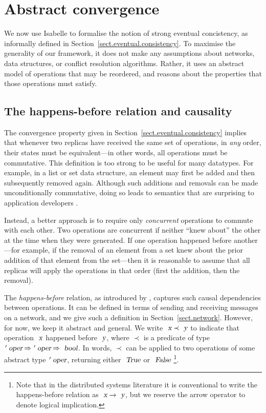 \section{Abstract convergence}
\label{sect.abstract.convergence}

We now use Isabelle to formalise the notion of strong eventual concistency, as informally defined in Section~\ref{sect.eventual.consistency}.
To maximise the generality of our framework, it does not make any assumptions about networks, data structures, or conflict resolution algorithms.
Rather, it uses an abstract model of operations that may be reordered, and reasons about the properties that those operations must satisfy.

\subsection{The happens-before relation and causality}\label{sect.happens.before}

The convergence property given in Section~\ref{sect.eventual.consistency} implies that whenever two replicas have received the same set of operations, in \emph{any} order, their states must be equivalent---in other words, all operations must be commutative.
This definition is too strong to be useful for many datatypes.
For example, in a list or set data structure, an element may first be added and then subsequently removed again.
Although such additions and removals can be made unconditionally commutative, doing so leads to semantics that are surprising to application developers \cite{Bieniusa:2012wu,Bieniusa:2012gt}.

Instead, a better approach is to require only \emph{concurrent} operations to commute with each other.
Two operations are concurrent if neither ``knew about'' the other at the time when they were generated.
If one operation happened before another---for example, if the removal of an element from a set knew about the prior addition of that element from the set---then it is reasonable to assume that all replicas will apply the operations in that order (first the addition, then the removal).

The \emph{happens-before} relation, as introduced by \citet{Lamport:1978jq}, captures such causal dependencies between operations.
It can be defined in terms of sending and receiving messages on a network, and we give such a definition in Section~\ref{sect.network}.
However, for now, we keep it abstract and general.
We write $\isa{x} \prec \isa{y}$ to indicate that operation $\isa{x}$ happened before $\isa{y}$, where $\prec$ is a predicate of type $\isacharprime\isa{oper} \mathbin{\isasymRightarrow} \isacharprime\isa{oper} \mathbin{\isasymRightarrow} \isa{bool}$.
In words, $\prec$ can be applied to two operations of some abstract type $\isacharprime\isa{oper}$, returning either $\isa{True}$ or $\isa{False}$
\footnote{Note that in the distributed systems literature it is conventional to write the happens-before relation as $\isa{x} \rightarrow \isa{y}$, but we reserve the arrow operator to denote logical implication.}.

